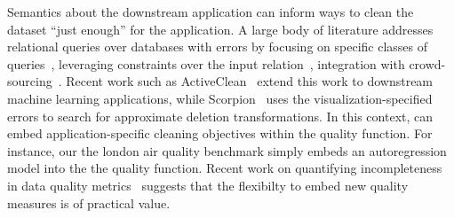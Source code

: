   Semantics about the downstream application can inform ways to clean the dataset ``just enough'' for the application.  
A large body of literature addresses relational queries over databases with errors by focusing on specific classes of queries~\cite{altwaijry2015query}, leveraging constraints over the input relation~\cite{2011Bertossi}, integration with crowd-sourcing~\cite{DBLP:conf/sigmod/BergmanMNT15}.   Recent work such as ActiveClean~\cite{DBLP:journals/pvldb/KrishnanWWFG16} extend this work to downstream machine learning applications, while Scorpion~\cite{DBLP:journals/pvldb/0002M13} uses the visualization-specified errors to search for approximate deletion transformations.   In this context, \sys can embed application-specific cleaning objectives within the quality function.  For instance, our the london air quality benchmark simply embeds an autoregression model into the the quality function. 
Recent work on quantifying incompleteness in data quality metrics~\cite{chung2016data} suggests that the flexibilty to embed new quality measures is of practical value.



